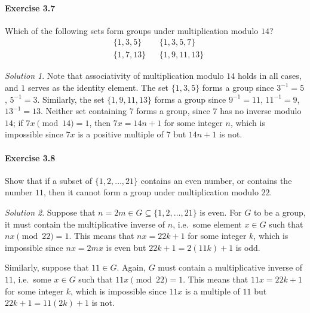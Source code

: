 \documentclass[11pt]{report}
\theoremstyle{remark}
\newtheorem*{solution}{Solution}
\begin{document}
    \paragraph{Exercise 3.7} Which of the following sets form groups under
    multiplication modulo $14$? \begin{align*}
        &\{1, 3, 5\} && \{1, 3, 5, 7\} \\
        &\{1, 7, 13\} && \{1, 9, 11, 13\}
    \end{align*}
    \begin{solution}
        Note that associativity of multiplication modulo $14$ holds in all cases,
        and $1$ serves as the identity element. The set $\{1, 3, 5\}$ forms a group
        since $3^{-1} = 5$, $5^{-1} = 3$. Similarly, the set $\{1, 9, 11, 13\}$
        forms a group since $9^{-1} = 11$, $11^{-1} = 9$, $13^{-1} = 13$.
        Neither set containing $7$ forms a group, since $7$ has no inverse modulo
        $14$; if $7x \pmod{14} = 1$, then $7x = 14n + 1$ for some integer $n$, which
        is impossible since $7x$ is a positive multiple of $7$ but $14n + 1$ is not.
    \end{solution}
    
    \paragraph{Exercise 3.8} Show that if a subset of $\{1, 2, \dots, 21\}$ contains
    an even number, or contains the number $11$, then it cannot form a group under
    multiplication modulo $22$.
    \begin{solution}
        Suppose that $n = 2m \in G \subseteq \{1, 2, \dots, 21\}$ is even. For $G$ to
        be a group, it must contain the multiplicative inverse of $n$, i.e.\ some
        element $x \in G$ such that $nx \pmod{22} = 1$. This means that $nx = 22k +
        1$ for some integer $k$, which is impossible since $nx = 2mx$ is even but
        $22k + 1 = 2(11k) + 1$ is odd.

        Similarly, suppose that $11 \in G$. Again, $G$ must contain a multiplicative inverse of
        $11$, i.e.\ some $x \in G$ such that $11x \pmod{22} = 1$. This means that
        $11x = 22k + 1$ for some integer $k$, which is impossible since $11x$ is a
        multiple of $11$ but $22k + 1 = 11(2k) + 1$ is not.
    \end{solution}
\end{document}
